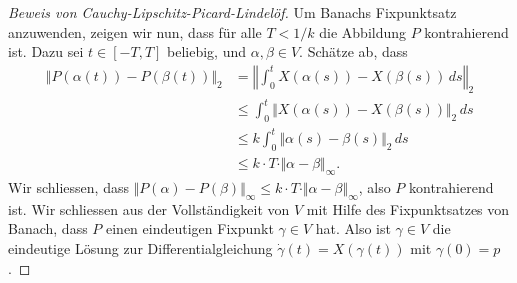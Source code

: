 \documentclass[../main.tex]{subfiles}
\begin{document}
\begin{proof}[Beweis von Cauchy-Lipschitz-Picard-Lindelöf]
  Um Banachs Fixpunktsatz anzuwenden, zeigen wir nun,
  dass für alle $T < 1/k$ die Abbildung $P$ kontrahierend ist.
  Dazu sei $t \in [-T, T]$ beliebig,
  und $\alpha, \beta \in V$. Schätze ab, dass
  \begin{align*}
    \Vert P(\alpha(t)) - P(\beta(t)) \Vert_2
    & = \left\Vert \int_{0}^{t} X(\alpha(s)) - X(\beta(s)) \, ds 
    \right\Vert_2\\
    &\leq \int_{0}^{t} \Vert X(\alpha(s)) - X(\beta(s)) \Vert_2 \, ds\\
    &\leq k \int_{0}^{t} \Vert \alpha(s) - \beta(s) \Vert_2 \, ds \\
    &\leq k \cdot T \cdot \Vert \alpha - \beta \Vert_{\infty}.
  \end{align*}
  Wir schliessen, dass $\Vert P(\alpha) - P(\beta) \Vert_{\infty}
  \leq k \cdot T \cdot \Vert \alpha - \beta \Vert_{\infty}$,
  also $P$ kontrahierend ist.
  Wir schliessen aus der Vollständigkeit von $V$ 
  mit Hilfe des Fixpunktsatzes von Banach, dass $P$ 
  einen eindeutigen Fixpunkt $\gamma \in V$ hat.
  Also ist $\gamma \in V$ die eindeutige Lösung
  zur Differentialgleichung $\dot \gamma(t) = X(\gamma(t))$ 
  mit $\gamma(0) = p$.
\end{proof}
\end{document}
